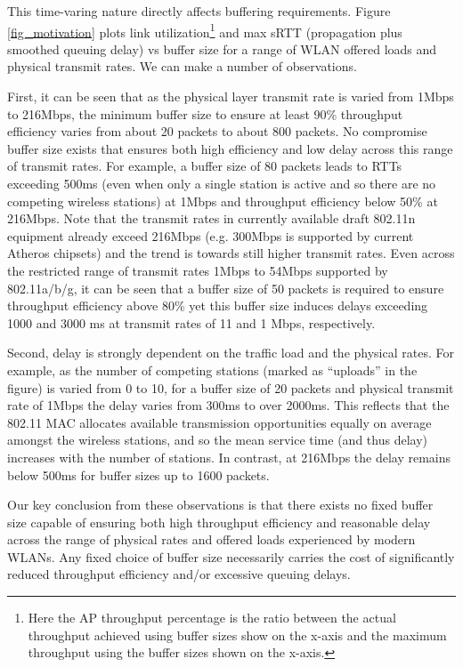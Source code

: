 \documentclass[10pt,twocolumn, journal]{IEEEtran}
\begin{document}
This time-varing nature directly affects buffering requirements. Figure \ref{fig_motivation} plots link utilization\footnote{Here the AP throughput percentage is the ratio between the actual throughput achieved using buffer sizes show on the x-axis and the maximum throughput using the buffer sizes shown on the x-axis.} and max sRTT (propagation plus smoothed queuing delay) vs buffer size for a range of WLAN offered loads and physical transmit rates.   We can make a number of observations.

First, it can be seen that as the physical layer transmit rate is varied from 1Mbps to 216Mbps, the minimum buffer size to ensure at least 90\% throughput efficiency varies from about 20 packets to about 800 packets.   No compromise buffer size exists that ensures both high efficiency and low delay across this range of transmit rates.  For example, a buffer size of 80 packets leads to RTTs exceeding 500ms (even when only a single station is active and so there are no competing wireless stations) at 1Mbps and throughput efficiency below 50\% at 216Mbps.   Note that the transmit rates in currently available draft 802.11n equipment already exceed 216Mbps (e.g. 300Mbps is supported by current Atheros chipsets) and the trend is towards still higher transmit rates.   Even across the restricted range of transmit rates 1Mbps to 54Mbps supported by 802.11a/b/g, it can be seen that a buffer size of 50 packets is required to ensure throughput efficiency above 80\% yet this buffer size induces delays exceeding 1000 and 3000 ms at transmit rates of 11 and 1 Mbps, respectively.

Second, delay is strongly dependent on the traffic load and the physical rates.   For example, as the number of competing stations (marked as ``uploads'' in the figure) is varied from 0 to 10, for a buffer size of 20 packets and physical transmit rate of 1Mbps the delay varies from 300ms to over 2000ms.   This reflects that the 802.11 MAC allocates available transmission opportunities equally on average amongst the wireless stations, and so the mean service time (and thus delay) increases with the number of stations.    In contrast, at 216Mbps the delay remains below 500ms for buffer sizes up to 1600 packets.

Our key conclusion from these observations is that there exists no fixed buffer size capable of ensuring both high throughput efficiency and reasonable delay across the range of physical rates and offered loads experienced by modern WLANs.   Any fixed choice of buffer size necessarily carries the cost of significantly reduced throughput efficiency and/or excessive queuing delays.
\end{document}
